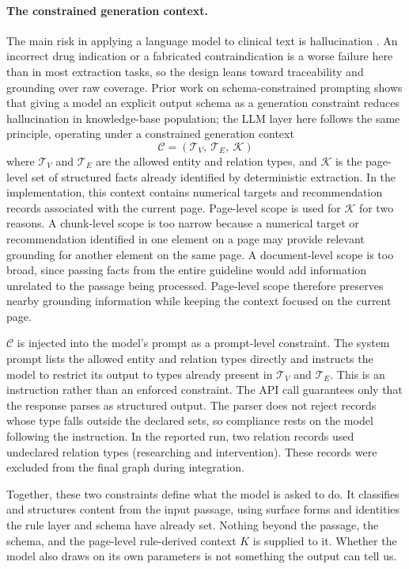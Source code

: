 \paragraph{The constrained generation context.}
The main risk in applying a language model to clinical text is hallucination \cite{huang2025}. An incorrect drug indication or a fabricated contraindication is a worse failure here than in most extraction tasks, so the design leans toward traceability and grounding over raw coverage. Prior work on schema-constrained prompting shows that giving a model an explicit output schema as a generation constraint reduces hallucination in knowledge-base population; the LLM layer here follows the same principle, operating under a constrained generation context
$$\mathcal{C} = (\mathcal{T}_V,\ \mathcal{T}_E,\ \mathcal{K})$$
where $\mathcal{T}_V$ and $\mathcal{T}_E$ are the allowed entity and relation types, and $\mathcal{K}$ is the page-level set of structured facts already identified by deterministic extraction. In the implementation, this context contains numerical targets and recommendation records associated with the current page. Page-level scope is used for $\mathcal{K}$ for two reasons. A chunk-level
scope is too narrow because a numerical target or recommendation identified
in one element on a page may provide relevant grounding for another element
on the same page. A document-level scope is too broad, since passing facts
from the entire guideline would add information unrelated to the passage
being processed. Page-level scope therefore preserves nearby grounding
information while keeping the context focused on the current page.

$\mathcal{C}$ is injected into the model's prompt as a prompt-level constraint. The system prompt lists the allowed entity and relation types directly and instructs the model to restrict its output to types already present in $\mathcal{T}_V$ and $\mathcal{T}_E$. This is an instruction rather than an enforced constraint. The API call guarantees only that the response parses as structured output. The parser does not reject records whose type falls outside the declared sets, so compliance rests on the model following the instruction. In the reported run, two relation records used undeclared relation types (researching and intervention). These records were excluded from the final graph during integration.

Together, these two constraints define what the model is asked to do. It classifies and structures content from the input passage, using surface forms and identities the rule layer and schema have already set. Nothing beyond the passage, the schema, and the page-level rule-derived context \(K\) is supplied to it. Whether the model also draws on its own parameters is not something the output can tell us.

